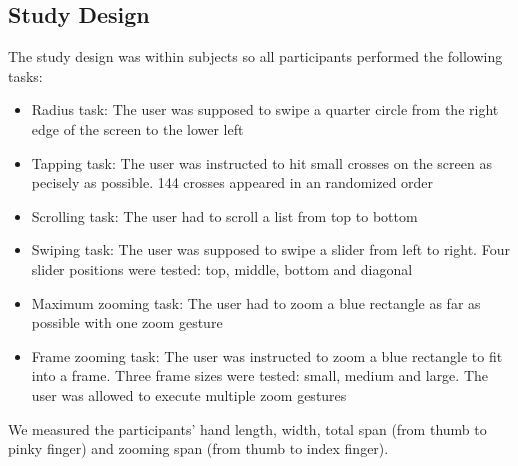 \documentclass{sigchi}
\begin{document}
\subsection{Study Design}
The study design was within subjects so all participants performed the following tasks:
\begin{itemize}
	\item{Radius task:} The user was supposed to swipe a quarter circle from the right edge of the screen to the lower left
	\item{Tapping task:} The user was instructed to hit small crosses on the screen as pecisely as possible. 144 crosses appeared in an randomized order
	\item{Scrolling task:} The user had to scroll a list from top to bottom
	\item{Swiping task:} The user was supposed to swipe a slider from left to right. Four slider positions were tested: top, middle, bottom and diagonal
	\item{Maximum zooming task:} The user had to zoom a blue rectangle as far as possible with one zoom gesture
	\item{Frame zooming task:} The user was instructed to zoom a blue rectangle to fit into a frame. Three frame sizes were tested: small, medium and large. The user was allowed to execute multiple zoom gestures
\end{itemize}
We measured the participants' hand length, width, total span (from thumb to pinky finger) and zooming span (from thumb to index finger).
\end{document}
